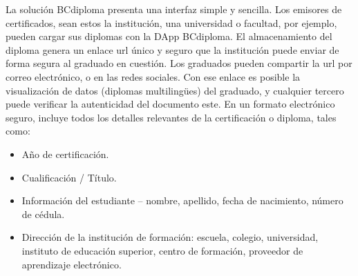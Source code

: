 La solución BCdiploma presenta una interfaz simple y sencilla. Los emisores de certificados, sean estos la institución, una universidad o facultad, por ejemplo, pueden cargar sus diplomas con la DApp BCdiploma. El almacenamiento del diploma genera un enlace url único y seguro que la institución puede enviar de forma segura al graduado en cuestión. Los graduados pueden compartir la url por correo electrónico, o en las redes sociales. Con ese enlace es posible la visualización de datos (diplomas multilingües) del graduado, y cualquier tercero puede verificar la autenticidad del documento este. En un formato electrónico seguro, incluye todos los detalles relevantes de la certificación o diploma, tales como:

\begin{itemize}
\item Año de certificación.
\item Cualificación / Título.
\item Información del estudiante – nombre, apellido, fecha de nacimiento, número de cédula.
\item Dirección de la institución de formación: escuela, colegio, universidad, instituto de educación superior, centro de formación, proveedor de aprendizaje electrónico.
\end{itemize}



%


